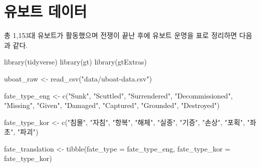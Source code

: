 \documentclass[
  letterpaper,
  chapter,a4paper,showtrims,openright,hidelinks]{oblivoir}
\newenvironment{Shaded}{\begin{snugshade}}{\end{snugshade}}
\newcommand{\AttributeTok}[1]{\textcolor[rgb]{0.40,0.45,0.13}{#1}}
\newcommand{\FunctionTok}[1]{\textcolor[rgb]{0.28,0.35,0.67}{#1}}
\newcommand{\NormalTok}[1]{\textcolor[rgb]{0.00,0.23,0.31}{#1}}
\newcommand{\OtherTok}[1]{\textcolor[rgb]{0.00,0.23,0.31}{#1}}
\newcommand{\StringTok}[1]{\textcolor[rgb]{0.13,0.47,0.30}{#1}}
\begin{document}
\hypertarget{uxc720uxbcf4uxd2b8-uxb370uxc774uxd130}{%
\section{유보트 데이터}\label{uxc720uxbcf4uxd2b8-uxb370uxc774uxd130}}

총 1,153대 유보트가 활동했으며 전쟁이 끝난 후에 유보트 운명을 표로
정리하면 다음과 같다.

\begin{Shaded}
\begin{Highlighting}[]
\FunctionTok{library}\NormalTok{(tidyverse)}
\FunctionTok{library}\NormalTok{(gt)}
\FunctionTok{library}\NormalTok{(gtExtras)}

\NormalTok{uboat\_raw }\OtherTok{\textless{}{-}} \FunctionTok{read\_csv}\NormalTok{(}\StringTok{"data/uboat{-}data.csv"}\NormalTok{)}

\NormalTok{fate\_type\_eng }\OtherTok{\textless{}{-}} \FunctionTok{c}\NormalTok{(}\StringTok{"Sunk"}\NormalTok{, }\StringTok{"Scuttled"}\NormalTok{, }\StringTok{"Surrendered"}\NormalTok{, }\StringTok{"Decommissioned"}\NormalTok{, }\StringTok{"Missing"}\NormalTok{, }
\StringTok{"Given"}\NormalTok{, }\StringTok{"Damaged"}\NormalTok{, }\StringTok{"Captured"}\NormalTok{, }\StringTok{"Grounded"}\NormalTok{, }\StringTok{"Destroyed"}\NormalTok{)}

\NormalTok{fate\_type\_kor }\OtherTok{\textless{}{-}} \FunctionTok{c}\NormalTok{(}\StringTok{"침몰"}\NormalTok{, }\StringTok{"자침"}\NormalTok{, }\StringTok{"항복"}\NormalTok{, }\StringTok{"해체"}\NormalTok{, }\StringTok{"실종"}\NormalTok{, }\StringTok{"기증"}\NormalTok{, }\StringTok{"손상"}\NormalTok{, }\StringTok{"포획"}\NormalTok{, }\StringTok{"좌초"}\NormalTok{, }\StringTok{"파괴"}\NormalTok{)}

\NormalTok{fate\_translation }\OtherTok{\textless{}{-}} \FunctionTok{tibble}\NormalTok{(}\AttributeTok{fate\_type =}\NormalTok{ fate\_type\_eng,}
                           \AttributeTok{fate\_type\_kor =}\NormalTok{ fate\_type\_kor)}


\end{Highlighting}
\end{Shaded}
\end{document}
